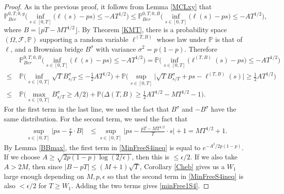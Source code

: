 \begin{proof}
	As in the previous proof, it follows from Lemma \ref{MCLxy} that
	\[
	\mathbb{P}^{0,T,0,y}_{Ber}\Big( \inf_{s \in [ 0, T]}\big( \ell(s) -  ps \big) \leq -AT^{1/2} \Big) \leq \mathbb{P}^{0,T,0,B}_{Ber}\Big( \inf_{s \in [ 0, T]}\big( \ell(s) -  ps \big) \leq -AT^{1/2} \Big),
	\]
	where $B=\lfloor pT - MT^{1/2}\rfloor$. By Theorem \ref{KMT}, there is a probability space $(\Omega,\mathcal{F},\mathbb{P})$ supporting a random variable $\ell^{(T,B)}$ whose law under $\mathbb{P}$ is that of $\ell$, and a Brownian bridge $B^\sigma$ with variance $\sigma^2 = p(1-p)$. Therefore
	\begin{align}
	&\mathbb{P}^{0,T,0,B}_{Ber}\Big( \inf_{s \in [ 0, T]}\big( \ell(s) -  ps \big) \leq -AT^{1/2} \Big) = \mathbb{P}\Big( \inf_{s \in [ 0, T]}\big( \ell^{(T,B)}(s) -  ps \big) \leq -AT^{1/2} \Big)\nonumber\\
	\leq \; & \mathbb{P}\Big( \inf_{s \in [ 0, T]}  \sqrt{T}B^\sigma_{s/T} \leq -\frac{1}{2}AT^{1/2} \Big) + \mathbb{P}\Big( \sup_{s\in [0,T]} \Big|\sqrt{T} B^\sigma_{s/T} + ps - \ell^{(T,B)}(s) \Big| \geq \frac{1}{2}AT^{1/2} \Big)\nonumber\\
	\leq \; & \mathbb{P}\Big( \max_{s\in[0,T]} B^\sigma_{s/T} \geq A/2 \Big) + \mathbb{P}\Big(\Delta(T,B) \geq \frac{1}{2}AT^{1/2} - MT^{1/2} - 1\Big). \label{MinFreeS4ineq}
	\end{align}
	For the first term in the last line, we used the fact that $B^\sigma$ and $-B^\sigma$ have the same distribution. For the second term, we used the fact that
	\begin{align*}
	\sup_{s\in[0,T]}\Big| ps - \frac{s}{T}\cdot B \Big| &\leq \sup_{s\in[0,T]}\Big| ps - \frac{pT-MT^{1/2}}{T}\cdot s \Big| + 1 = MT^{1/2} + 1.
	\end{align*}
	By Lemma \ref{BBmax}, the first term in \eqref{MinFreeS4ineq} is equal to $e^{-A^2/2p(1-p)}$. If we choose $A \geq \sqrt{2p(1-p)\log(2/\epsilon)}$, then this is $\leq \epsilon/2$. If we also take $A > 2M$, then since $|B-pT| \leq (M+1)\sqrt{T}$, Corollary \ref{Cheb} gives us a $W_1$ large enough depending on $M,p,\epsilon$ so that the second term in \eqref{MinFreeS4ineq} is also $<\epsilon/2$ for $T\geq W_1$. Adding the two terms gives \eqref{minFree1S4}.
\end{proof}

